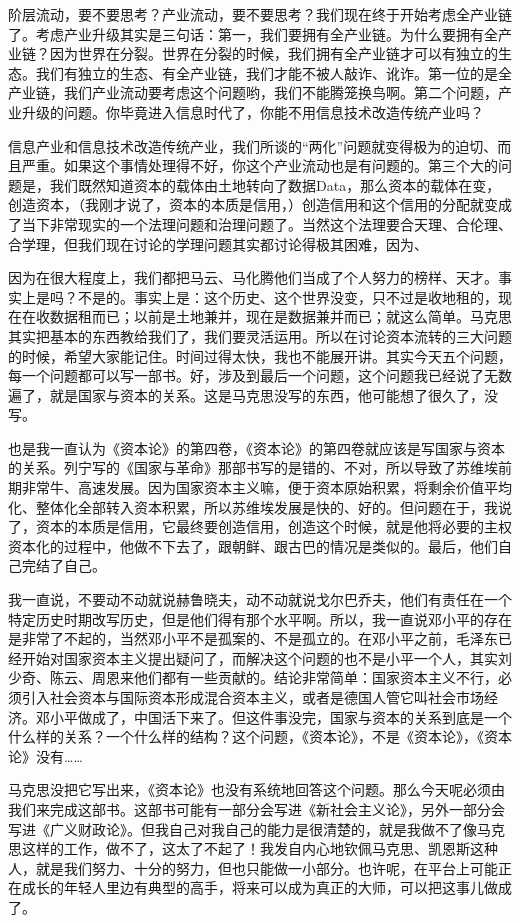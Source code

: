 \documentclass[UTF8, 12pt, a4paper]{ctexrep}
\begin{document}
阶层流动，要不要思考？产业流动，要不要思考？我们现在终于开始考虑全产业链了。考虑产业升级其实是三句话：第一，我们要拥有全产业链。为什么要拥有全产业链？因为世界在分裂。世界在分裂的时候，我们拥有全产业链才可以有独立的生态。我们有独立的生态、有全产业链，我们才能不被人敲诈、讹诈。第一位的是全产业链，我们产业流动要考虑这个问题哟，我们不能腾笼换鸟啊。第二个问题，产业升级的问题。你毕竟进入信息时代了，你能不用信息技术改造传统产业吗？

信息产业和信息技术改造传统产业，我们所谈的“两化”问题就变得极为的迫切、而且严重。如果这个事情处理得不好，你这个产业流动也是有问题的。第三个大的问题是，我们既然知道资本的载体由土地转向了数据Data，那么资本的载体在变，创造资本，（我刚才说了，资本的本质是信用，）创造信用和这个信用的分配就变成了当下非常现实的一个法理问题和治理问题了。当然这个法理要合天理、合伦理、合学理，但我们现在讨论的学理问题其实都讨论得极其困难，因为、

因为在很大程度上，我们都把马云、马化腾他们当成了个人努力的榜样、天才。事实上是吗？不是的。事实上是：这个历史、这个世界没变，只不过是收地租的，现在在收数据租而已；以前是土地兼并，现在是数据兼并而已；就这么简单。马克思其实把基本的东西教给我们了，我们要灵活运用。所以在讨论资本流转的三大问题的时候，希望大家能记住。时间过得太快，我也不能展开讲。其实今天五个问题，每一个问题都可以写一部书。好，涉及到最后一个问题，这个问题我已经说了无数遍了，就是国家与资本的关系。这是马克思没写的东西，他可能想了很久了，没写。

也是我一直认为《资本论》的第四卷，《资本论》的第四卷就应该是写国家与资本的关系。列宁写的《国家与革命》那部书写的是错的、不对，所以导致了苏维埃前期非常牛、高速发展。因为国家资本主义嘛，便于资本原始积累，将剩余价值平均化、整体化全部转入资本积累，所以苏维埃发展是快的、好的。但问题在于，我说了，资本的本质是信用，它最终要创造信用，创造这个时候，就是他将必要的主权资本化的过程中，他做不下去了，跟朝鲜、跟古巴的情况是类似的。最后，他们自己完结了自己。

我一直说，不要动不动就说赫鲁晓夫，动不动就说戈尔巴乔夫，他们有责任在一个特定历史时期改写历史，但是他们得有那个水平啊。所以，我一直说邓小平的存在是非常了不起的，当然邓小平不是孤案的、不是孤立的。在邓小平之前，毛泽东已经开始对国家资本主义提出疑问了，而解决这个问题的也不是小平一个人，其实刘少奇、陈云、周恩来他们都有一些贡献的。结论非常简单：国家资本主义不行，必须引入社会资本与国际资本形成混合资本主义，或者是德国人管它叫社会市场经济。邓小平做成了，中国活下来了。但这件事没完，国家与资本的关系到底是一个什么样的关系？一个什么样的结构？这个问题，《资本论》，不是《资本论》，《资本论》没有……

马克思没把它写出来，《资本论》也没有系统地回答这个问题。那么今天呢必须由我们来完成这部书。这部书可能有一部分会写进《新社会主义论》，另外一部分会写进《广义财政论》。但我自己对我自己的能力是很清楚的，就是我做不了像马克思这样的工作，做不了，这太了不起了！我发自内心地钦佩马克思、凯恩斯这种人，就是我们努力、十分的努力，但也只能做一小部分。也许呢，在平台上可能正在成长的年轻人里边有典型的高手，将来可以成为真正的大师，可以把这事儿做成了。
\end{document}

